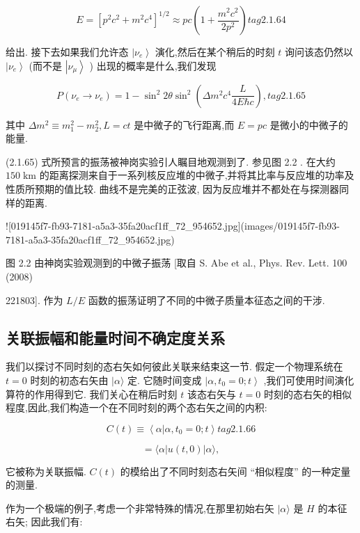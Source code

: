 \documentclass[lang=cn,newtx,10pt,scheme=chinese,thmcnt=section]{elegantbook}
\begin{document}
$$
E = {\left\lbrack {p}^{2}{c}^{2} + {m}^{2}{c}^{4}\right\rbrack }^{1/2} \approx {pc}\left( {1 + \frac{{m}^{2}{c}^{2}}{2{p}^{2}}}\right) tag{2.1.64}
$$

给出. 接下去如果我们允许态 $\left| {\nu }_{e}\right\rangle$ 演化,然后在某个稍后的时刻 $t$ 询问该态仍然以 $\left| {\nu }_{e}\right\rangle$ (而不是 $\left| {\nu }_{\mu }\right\rangle$ ) 出现的概率是什么,我们发现

$$
P\left( {{\nu }_{e} \rightarrow {\nu }_{e}}\right) = 1 - {\sin }^{2}{2\theta }{\sin }^{2}\left( {\Delta {m}^{2}{c}^{4}\frac{L}{{4E}\hbar c}}\right) , tag{2.1.65}
$$

其中 $\Delta {m}^{2} \equiv {m}_{1}^{2} - {m}_{2}^{2}, L = {ct}$ 是中微子的飞行距离,而 $E = {pc}$ 是微小的中微子的能量.

(2.1.65) 式所预言的振荡被神岗实验引人瞩目地观测到了. 参见图 2.2 . 在大约 ${150}\mathrm{\;{km}}$ 的距离探测来自于一系列核反应堆的中微子,并将其比率与反应堆的功率及性质所预期的值比较. 曲线不是完美的正弦波, 因为反应堆并不都处在与探测器同样的距离.

![019145f7-fb93-7181-a5a3-35fa20acf1ff_72_954652.jpg](images/019145f7-fb93-7181-a5a3-35fa20acf1ff_72_954652.jpg)

图 2.2 由神岗实验观测到的中微子振荡 [取自 S. Abe et al., Phys. Rev. Lett. 100 (2008)

221803]. 作为 $L/E$ 函数的振荡证明了不同的中微子质量本征态之间的干涉.

\subsection*{关联振幅和能量时间不确定度关系}

我们以探讨不同时刻的态右矢如何彼此关联来结束这一节. 假定一个物理系统在 $t = 0$ 时刻的初态右矢由 $|\alpha \rangle$ 定. 它随时间变成 $\left| {\alpha ,{t}_{0} = 0;t}\right\rangle$ ,我们可使用时间演化算符的作用得到它. 我们关心在稍后时刻 $t$ 该态右矢与 $t = 0$ 时刻的态右矢的相似程度,因此,我们构造一个在不同时刻的两个态右矢之间的内积:

$$
C\left( t\right) \equiv \left\langle {\alpha | \alpha ,{t}_{0} = 0;t}\right\rangle tag{2.1.66}
$$

$$
= \langle \alpha \left| {u\left( {t,0}\right) }\right| \alpha \rangle ,
$$

它被称为关联振幅. $C\left( t\right)$ 的模给出了不同时刻态右矢间 “相似程度” 的一种定量的测量.

作为一个极端的例子,考虑一个非常特殊的情况,在那里初始右矢 $|\alpha \rangle$ 是 $H$ 的本征右矢; 因此我们有:
\end{document}
